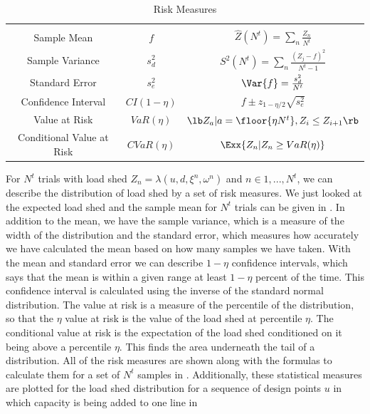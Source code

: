 \newcommand{\tabheight}{11pt}
\begin{table}
\centering
\begin{tabular}{| c | c | c|}
\hline
& & \\[1pt]
Sample Mean & $f$ &$ \hat{Z}(N^t)=\sum_n \frac{Z_n}{N^t} $\\[\tabheight]
Sample Variance & $s^2_d$ &$ S^2(N^t)=\sum_n \frac{\left(Z_j - f\right)^2}{N^t-1} $\\[\tabheight]
Standard Error & $s^2_e$ &$ \Var{f}= \frac{s^2_d}{N^t}$\\[\tabheight]
Confidence Interval& $CI(1-\eta)$  & $f \pm z_{1-\eta/2} \sqrt{s^2_e}$ \\[\tabheight]
Value at Risk & $ VaR(\eta)$& $ \lb Z_{a} |  a = \floor{ \eta N^t }, Z_i \leq Z_{i+1}\rb $\\[\tabheight]  %
Conditional Value at Risk & $ CVaR(\eta)$& $\Exx{Z_n | Z_n \geq VaR(\eta)}$ \\[\tabheight]
\hline
\end{tabular}
\caption{Risk Measures}\label{tab:risk}
\end{table}

For $N^t$ trials with load shed $Z_n = \lambda (u,d,\xi^n,\omega^n )$ and $n \in 1,...,N^t$, we can describe the distribution of load shed by a set of risk measures.  We just looked at the expected load shed and the sample mean for $N^t$ trials can be given in .  In addition to the mean, we have the sample variance, which is a measure of the width of the distribution and the standard error, which measures how accurately we have calculated the mean based on how many samples we have taken.  With the mean and standard error we can describe $1-\eta$ confidence intervals, which says that the mean is within a given range at least $1-\eta$ percent of the time.  This confidence interval is calculated using the inverse of the standard normal distribution.  The value at risk is a measure of the percentile of the distribution, so that the $\eta$ value at risk is the value of the load shed at percentile $\eta$.  The conditional value at risk is the expectation of the load shed conditioned on it being above a percentile $\eta$.  This finds the area underneath the tail of a distribution.  All of the risk measures are shown along with the formulas to calculate them for a set of $N^t$ samples in .  Additionally, these statistical measures are plotted for the load shed distribution for a sequence of design points $u$ in which capacity is being added to one line in 

